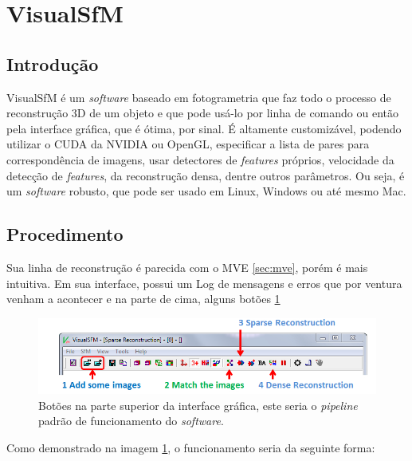 \section{VisualSfM}\label{sec:visualsfm}
%
\subsection{Introdução}

VisualSfM é um {\it software} baseado em fotogrametria que faz todo o processo de reconstrução 3D de um objeto e que pode usá-lo por linha de comando ou então pela interface gráfica, que é ótima, por sinal. É altamente customizável, podendo utilizar o CUDA da NVIDIA ou OpenGL, especificar a lista de pares para correspondência de imagens, usar detectores de {\it features} próprios, velocidade da detecção de {\it features}, da reconstrução densa, dentre outros parâmetros. Ou seja, é um {\it software} robusto, que pode ser usado em Linux, Windows ou até mesmo Mac.

\subsection{Procedimento}

Sua linha de reconstrução é parecida com o MVE \ref{sec:mve}, porém é mais intuitiva. Em sua interface, possui um Log de mensagens e erros que por ventura venham a acontecer e na parte de cima, alguns botões \ref{fig:pipelineVisualSfM}

\begin{figure}[!h]
	\centering

	\includegraphics[width=1\linewidth]{figs/pipelinevisualsfm.png}
	\caption{%
	Botões na parte superior da interface gráfica, este seria o {\it pipeline} padrão de funcionamento do {\it software}.
	}\label{fig:pipelineVisualSfM}
\end{figure}

Como demonstrado na imagem \ref{fig:pipelineVisualSfM}, o funcionamento seria da seguinte forma:

